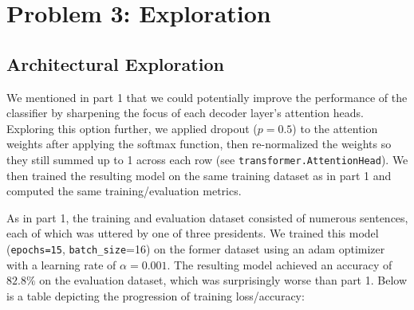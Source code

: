 \documentclass[10pt]{article}
\newcommand{\code}[1]{\texttt{#1}}
\theoremstyle{definition}
\begin{document}
\section{Problem 3: Exploration}
\subsection{Architectural Exploration}

\noindent We mentioned in part 1 that we could potentially improve the performance of the classifier by sharpening the focus of each decoder layer's attention heads. Exploring this option further, we applied dropout ($p =0.5$) to the attention weights after applying the softmax function, then re-normalized the weights so they still summed up to 1 across each row (see \code{transformer.AttentionHead}). We then trained the resulting model on the same training dataset as in part 1 and computed the same training/evaluation metrics.

\noindent As in part 1, the training and evaluation dataset consisted of numerous sentences, each of which was uttered by one of three presidents. We trained this model (\code{epochs=15}, \code{batch\_size}=16) on the former dataset using an adam optimizer with a learning rate of $\alpha = 0.001$. The resulting model achieved an accuracy of $82.8\%$ on the evaluation dataset, which was surprisingly worse than part 1. Below is a table depicting the progression of training loss/accuracy:\\
\begin{center}
\end{center}
\end{document}
